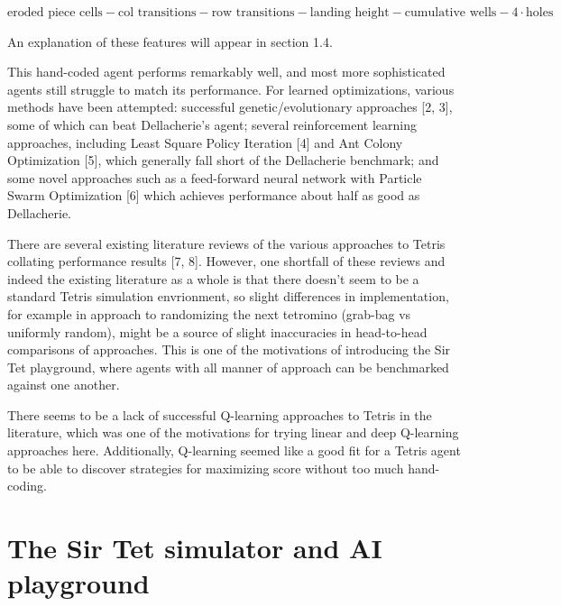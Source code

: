 \documentclass[11pt]{article}
\begin{document}
    \(\text{eroded piece cells} - \text{col transitions} - \text{row transitions} - \text{landing height} - \text{cumulative wells} - 4\cdot\text{holes}\)

    An explanation of these features will appear in section 1.4.

This hand-coded agent performs remarkably well, and most more
sophisticated agents still struggle to match its performance. For
learned optimizations, various methods have been attempted: successful
genetic/evolutionary approaches {[}2, 3{]}, some of which can beat
Dellacherie's agent; several reinforcement learning approaches,
including Least Square Policy Iteration {[}4{]} and Ant Colony
Optimization {[}5{]}, which generally fall short of the Dellacherie
benchmark; and some novel approaches such as a feed-forward neural
network with Particle Swarm Optimization {[}6{]} which achieves
performance about half as good as Dellacherie.

There are several existing literature reviews of the various approaches
to Tetris collating performance results {[}7, 8{]}. However, one
shortfall of these reviews and indeed the existing literature as a whole
is that there doesn't seem to be a standard Tetris simulation
envrionment, so slight differences in implementation, for example in
approach to randomizing the next tetromino (grab-bag vs uniformly
random), might be a source of slight inaccuracies in head-to-head
comparisons of approaches. This is one of the motivations of introducing
the Sir Tet playground, where agents with all manner of approach can be
benchmarked against one another.

There seems to be a lack of successful Q-learning approaches to Tetris
in the literature, which was one of the motivations for trying linear
and deep Q-learning approaches here. Additionally, Q-learning seemed
like a good fit for a Tetris agent to be able to discover strategies for
maximizing score without too much hand-coding.

    \hypertarget{the-sir-tet-simulator-and-ai-playground}{%
\section{The Sir Tet simulator and AI
playground}\label{the-sir-tet-simulator-and-ai-playground}}
\end{document}
